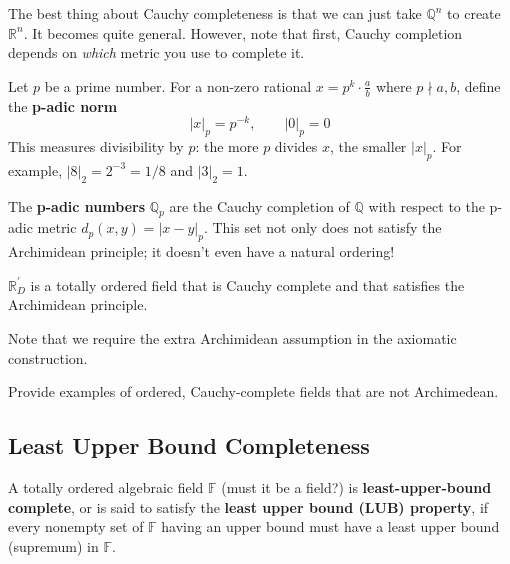   The best thing about Cauchy completeness is that we can just take $\mathbb{Q}^n$ to create $\mathbb{R}^n$. It becomes quite general. However, note that first, Cauchy completion depends on \textit{which} metric you use to complete it. 

  \begin{example}
    Let $p$ be a prime number. For a non-zero rational $x = p^k \cdot \frac{a}{b}$ where $p \nmid a, b$, define the \textbf{p-adic norm}
    \begin{equation}
      |x|_p = p^{-k}, \qquad |0|_p = 0
    \end{equation}
    This measures divisibility by $p$: the more $p$ divides $x$, the smaller $|x|_p$. For example, $|8|_2 = 2^{-3} = 1/8$ and $|3|_2 = 1$.

    The \textbf{p-adic numbers} $\mathbb{Q}_p$ are the Cauchy completion of $\mathbb{Q}$ with respect to the p-adic metric $d_p(x,y) = |x - y|_p$. This set not only does not satisfy the Archimidean principle; it doesn't even have a natural ordering! 
  \end{example} 

  \begin{definition}
    $\mathbb{R}_D^\prime$ is a totally ordered field that is Cauchy complete and that satisfies the Archimidean principle.
  \end{definition}

  Note that we require the extra Archimidean assumption in the axiomatic construction. 

  \begin{example}
    Provide examples of ordered, Cauchy-complete fields that are not Archimedean. 
  \end{example}

\subsection{Least Upper Bound Completeness}

  \begin{definition}
    A totally ordered algebraic field $\mathbb{F}$ (must it be a field?) is \textbf{least-upper-bound complete}, or is said to satisfy the \textbf{least upper bound (LUB) property}, if every nonempty set of $\mathbb{F}$ having an upper bound must have a least upper bound (supremum) in $\mathbb{F}$. 
  \end{definition} 

